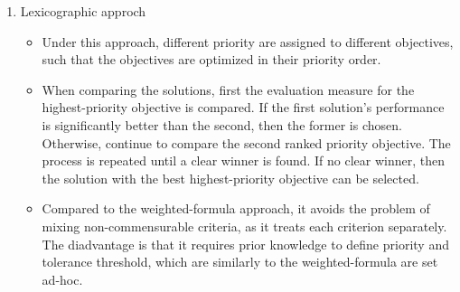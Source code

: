 \documentclass[12pt, a4paper]{article}
\begin{document}
\begin{enumerate}
 \item Lexicographic approch
  \begin{itemize}
   \item Under this approach, different priority are assigned to different objectives, such that the objectives are optimized in their priority order. 
   \item When comparing the solutions, first the evaluation measure for the highest-priority objective is compared. If the first solution's performance is significantly better than the second, then the former is chosen. Otherwise, continue to compare the second ranked priority objective. The process is repeated until a clear winner is found. If no clear winner, then the solution with the best highest-priority objective can be selected.
   \item Compared to the weighted-formula approach, it avoids the problem of mixing non-commensurable criteria, as it treats each criterion separately. The diadvantage is that it requires prior knowledge to define priority and tolerance threshold, which are similarly to the weighted-formula are set ad-hoc.
  \end{itemize}
 

\end{enumerate}
\end{document}
